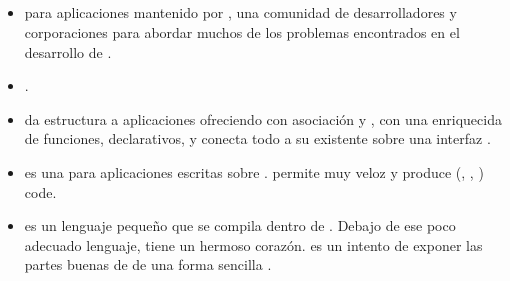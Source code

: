 \subsection{\clientSide}
\begin{itemize}
	\item \textbf{\angularjs} \framework \openSourcePC para aplicaciones \web mantenido por \google, una comunidad de desarrolladores y corporaciones para abordar muchos de los problemas encontrados en el desarrollo de \singlePageApp\cite{technology_angularjs}.
	\item \textbf{\emberjs}\cite{online_technology_emberjs}.
	\item \textbf{\backbonejs} da estructura a aplicaciones \web ofreciendo \textbf{\modelsCustom} con asociación \keyValue y \events \custom, \textbf{\collectionsDB} con una \api enriquecida de funciones, \textbf{\views} \handling \event declarativos, y conecta todo a su \api existente sobre una interfaz \json \restful \cite{online_technology_backbone}.
	
	\item \textbf{\meteor} es una \framework  \openSourcePC \realTimeINT para aplicaciones \web \javaScriptNAME escritas sobre \nodejsNAME \cite{online_meteor_documentation}. \meteor permite \prototyping muy veloz \cite{online_meteor_documentation_why} y produce \crossPlatform (\web, \android, \ios) code\cite{online_meteor_cross_platform}.
	
	\item \textbf{\coffeescript} es un lenguaje pequeño que se compila dentro de \javaScriptNAME. Debajo de ese poco adecuado lenguaje, \javaScriptNAME tiene un hermoso corazón. \coffeescript es un intento de exponer las partes buenas de \javaScriptNAME de una forma sencilla \cite{technology_coffeescript}.
	
	
	

\end{itemize}

